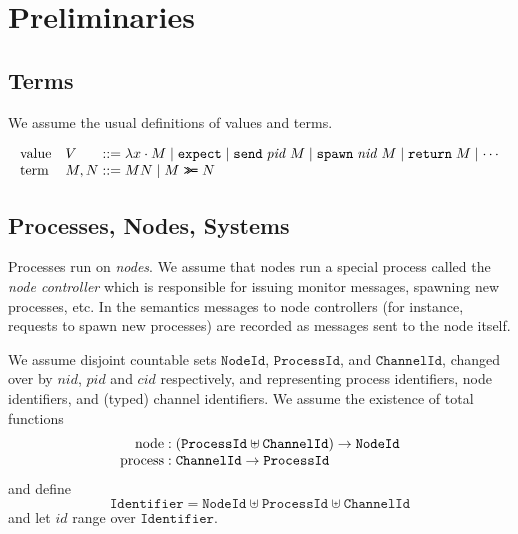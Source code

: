\documentclass{article}
\newcommand{\sLam}[2]{\lambda {#1} \cdot {#2}}
\newcommand{\sApp}[2]{{#1} {#2}}
\newcommand{\sBind}[2]{{#1} \mathrel{\texttt{>}\!\!\texttt{>}\!\texttt{=}} {#2}}
\newcommand{\sReturn}{\mathtt{return}}
\newcommand{\sExpect}{\mathtt{expect}}
\newcommand{\sSend}{\mathtt{send}}
\newcommand{\sSpawn}{\mathtt{spawn}}
\DeclareMathOperator{\sNodeOf}{node}
\DeclareMathOperator{\sProcessOf}{process}
\newcommand{\sNid}{\ensuremath{\mathit{nid}}}
\newcommand{\sPid}{\ensuremath{\mathit{pid}}}
\newcommand{\sCid}{\ensuremath{\mathit{cid}}}
\newcommand{\sId}{\ensuremath{\mathit{id}}}
\newcommand{\OR}{\mathrel{|}}
\begin{document}
\section{Preliminaries}

\subsection{Terms}

We assume the usual definitions of values and terms.

\begin{equation*}
\begin{array}{ll@{\;::=\;}l}
\text{value} & V    & \sLam{x}{M} \OR
                      \sExpect \OR
                      \sSend \; \sPid \; M \OR
                      \sSpawn \; \sNid \; M \OR 
                      \sReturn \; M \OR
                      \cdots
\\
\text{term}  & M, N & \sApp{M}{N} \OR
                      \sBind{M}{N}
\end{array}
\end{equation*}

\subsection{Processes, Nodes, Systems}

Processes run on \emph{nodes}. We assume that nodes run a special process
called the \emph{node controller} which is responsible for issuing monitor
messages, spawning new processes, etc. In the semantics messages to node
controllers (for instance, requests to spawn new processes) are recorded as
messages sent to the node itself.

We assume disjoint countable sets $\mathtt{NodeId}$, $\mathtt{ProcessId}$, and
$\mathtt{ChannelId}$, changed over by \sNid, \sPid{} and \sCid{} respectively,
and representing process identifiers, node identifiers, and (typed) channel
identifiers. We assume the existence of total functions
%
\begin{equation*}
\begin{array}{r@{\;:\;}l}
\sNodeOf    & (\mathtt{ProcessId} \uplus \mathtt{ChannelId}) \rightarrow \mathtt{NodeId} \\
\sProcessOf & \mathtt{ChannelId} \rightarrow \mathtt{ProcessId} 
\end{array}
\end{equation*}
%
and define 
$$\mathtt{Identifier} = \mathtt{NodeId} \uplus \mathtt{ProcessId} \uplus \mathtt{ChannelId}$$ 
and let $\sId$ range over $\mathtt{Identifier}$.
\end{document}
